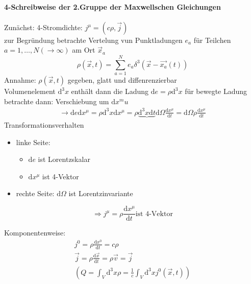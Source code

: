 \documentclass[a4paper]{article}
\begin{document}
\paragraph{4-Schreibweise der 2.Gruppe der Maxwellschen Gleichungen}
Zunächst: 4-Stromdichte: $j^\mu=(c\rho,\vec{j})$\\
zur Begründung betrachte Vertelung vun Punktladungen $e_a$ für Teilchen 
$a=1,\ldots,N(\rightarrow \infty)$ am Ort $\vec{x}_a$
\begin{equation}
\rho(\vec{x},t)=\sum_{a=1}^N e_a\delta^3(\vec{x}-\vec{x_a}(t))
\end{equation}
Annahme: $\rho(\vec{x},t)$ gegeben, glatt und diffenrenzierbar\\
Volumenelement $\mathrm{d}^3x$ enthält dann die Ladung $\mathrm{d}e=\rho \mathrm{d}^3x$
für bewegte Ladung betrachte dann: Verschiebung um $\mathrm{d}x^mu$
\begin{align}
\rightarrow \mathrm{d}e \mathrm{d}x^\mu=\rho \mathrm{d}^3x \mathrm{d}x^\mu=\rho
\underbrace{\mathrm{d}^3x\mathrm{d}t}{\mathrm{d}\Omega}\frac{\mathrm{d}x^\mu}{\mathrm{d}t}
=\mathrm{d}\Omega \rho \frac{\mathrm{d} x^\mu}{\mathrm{d}t}
\end{align}
Transformationsverhalten
\begin{itemize}
  \item linke Seite:
	\begin{itemize}
  		\item $\mathrm{d}e$ ist Lorentzskalar
  		\item $\mathrm{d}x^\mu$ ist 4-Vektor 
	\end{itemize}
  \item rechte Seite: $\mathrm{d}\Omega$ ist Lorentzinvariante
\end{itemize}
\begin{equation}
\Rightarrow j^\mu=\rho\frac{\mathrm{d}x^\mu}{\mathrm{d}t} \text{ist 4-Vektor}
\end{equation}

Komponentenweise:
\begin{align}
j^0=\rho \frac{\mathrm{d}x^0}{\mathrm{d}t}=c\rho\\
\vec{j}=\rho\frac{\mathrm{d}\vec{x}}{\mathrm{d}t}=\rho\vec{v}=\vec{j}\\
\left( Q=\int_V \mathrm{d}^3x\rho=\frac{1}{c}\int_V \mathrm{d}^3xj^0(\vec{x},t) \right)
\end{align}
\end{document}
